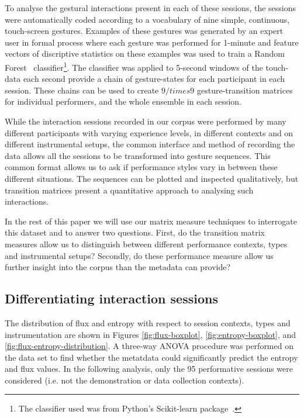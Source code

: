 \documentclass{sigchi}
\begin{document}
To analyse the gestural interactions present in each of these
sessions, the sessions were automatically coded according to a
vocabulary of nine simple, continuous, touch-screen gestures. Examples
of these gestures was generated by an expert user in formal process
where each gesture was performed for 1-minute and feature vectors of
discriptive statistics on these examples was used to train a Random
Forest~\cite{Breiman:2001kx} classifier\footnote{The classifier used
  was from Python's Scikit-learn package~\cite{scikit-learn}.}. The
classifier was applied to 5-second windows of the touch-data each
second provide a chain of gesture-states for each participant in each
session. These chains can be used to create $9 /times 9$
gesture-transition matrices for individual performers, and the whole
ensemble in each session.

While the interaction sessions recorded in our corpus were performed
by many different participants with varying experience levels, in
different contexts and on different instrumental setups, the common
interface and method of recording the data allows all the sessions to
be transformed into gesture sequences. This common format allows us to
ask if performance styles vary in between these different situations.
The sequences can be plotted and inspected qualitatively, but
transition matrices present a quantitative approach to analysing such
interactions.

In the rest of this paper we will use our matrix measure techniques to
interrogate this dataset and to answer two questions. First, do the
transition matrix measures allow us to distinguish between different
performance contexts, types and instrumental setups? Secondly, do
these performance measure allow us further insight into the corpus
than the metadata can provide?

\subsection{Differentiating interaction sessions}
\label{differentiating-interaction-sessions}

The distribution of flux and entropy with respect to session contexts,
types and instrumentation are shown in Figures \ref{fig:flux-boxplot},
\ref{fig:entropy-boxplot}, and \ref{fig:flux-entropy-distribution}. A
three-way ANOVA procedure was performed on the data set to find
whether the metatdata could significantly predict the entropy and flux
values. In the following analysis, only the 95 performative sessions
were considered (i.e. not the demonstration or data collection
contexts).
\end{document}

